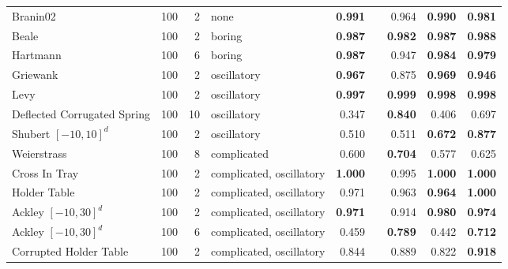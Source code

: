 \begin{table*}[t]
{\begin{tabular}{lrrlrr|rrr}
        Branin02           & 100     & 2 &  none            &               \textbf{0.991} &&   0.964 &          \textbf{0.990} &   \textbf{0.981} \\
        Beale              & 100     & 2 &  boring        &              \textbf{0.987} &&   \textbf{0.982} &         \textbf{0.987} &   \textbf{0.988} \\
        Hartmann           & 100     & 6 &  boring            &               \textbf{0.987} &&   0.947 &           \textbf{0.984} &   \textbf{0.979} \\
        Griewank           & 100     & 2 &  oscillatory            &              \textbf{0.967} &&   0.875 &         \textbf{0.969} &     \textbf{0.946} \\
        Levy               & 100     & 2 &  oscillatory            &               \textbf{0.997} &&   \textbf{0.999} &        \textbf{0.998} &      \textbf{0.998} \\
        Deflected Corrugated Spring & 100 & 10 &  oscillatory    &               0.347 &&   \textbf{0.840} &      0.406 &        0.697 \\
        Shubert $[-10, 10]^d$           & 100     & 2 &  oscillatory            &               0.510 &&   0.511 &          \textbf{0.672} &    \textbf{0.877} \\
        Weierstrass        & 100     & 8 &  complicated            &               0.600 &&   \textbf{0.704} &         0.577 &     0.625 \\
        Cross In Tray      & 100     & 2 &  complicated, oscillatory            &               \textbf{1.000} &&            0.995 &               \textbf{1.000} &               \textbf{1.000} \\
        Holder Table       & 100     & 2 &  complicated, oscillatory            &               0.971 &&            0.963 &                     \textbf{0.964} &         \textbf{1.000} \\
        Ackley $[-10, 30]^d$ & 100     & 2 &  complicated, oscillatory            &               \textbf{0.971} &&            0.914 &          \textbf{0.980} &                    \textbf{0.974} \\
        Ackley $[-10, 30]^d$ & 100     & 6 &  complicated, oscillatory            &               0.459 &&            \textbf{0.789} &                      0.442 &        \textbf{0.712} \\
        Corrupted Holder Table  & 100 & 2 & complicated, oscillatory            &              0.844 &&   0.889 &        0.822 &      \textbf{0.918} \\

\end{tabular}}
\end{table*}

